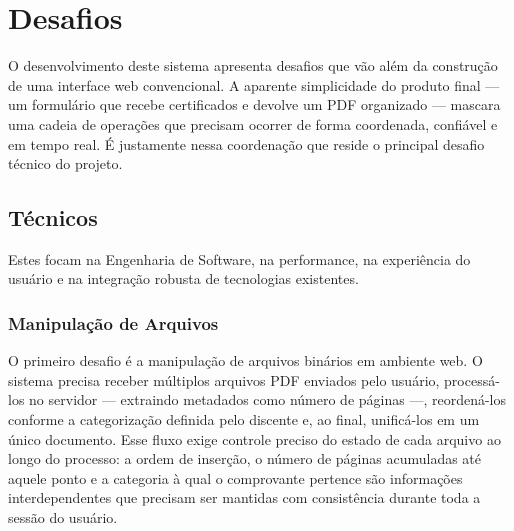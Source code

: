 \chapter{Desafios}

O desenvolvimento deste sistema apresenta desafios que vão além da construção de uma interface web convencional. A aparente simplicidade do produto final — um formulário que recebe certificados e devolve um PDF organizado — mascara uma cadeia de operações que precisam ocorrer de forma coordenada, confiável e em tempo real. É justamente nessa coordenação que reside o principal desafio técnico do projeto.



\section{Técnicos}

Estes focam na Engenharia de Software, na performance, na experiência do usuário e na integração robusta de tecnologias existentes.

\subsection{Manipulação de Arquivos}

O primeiro desafio é a manipulação de arquivos binários em ambiente web. O sistema precisa receber múltiplos arquivos PDF enviados pelo usuário, processá-los no servidor — extraindo metadados como número de páginas —, reordená-los conforme a categorização definida pelo discente e, ao final, unificá-los em um único documento. Esse fluxo exige controle preciso do estado de cada arquivo ao longo do processo: a ordem de inserção, o número de páginas acumuladas até aquele ponto e a categoria à qual o comprovante pertence são informações interdependentes que precisam ser mantidas com consistência durante toda a sessão do usuário.


